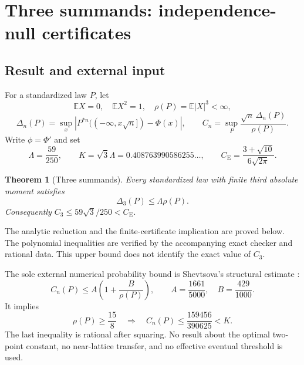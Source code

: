 \documentclass[11pt,a4paper]{article}
\numberwithin{equation}{section}
\newtheorem{theorem}{Theorem}[section]
\theoremstyle{definition}
\theoremstyle{remark}
\newcommand{\E}{\mathbb E}
\newcommand{\CE}{C_{\mathrm E}}
\newcommand{\Lam}{\frac{59}{250}}
\newcommand{\rhoMax}{\frac{15}{8}}
\begin{document}
\section{Three summands: independence-null certificates}\label{n3:section}
\subsection{Result and external input}
For a standardized law $P$, let
\[
 \E X=0,\quad \E X^2=1,\quad \rho(P)=\E|X|^3<\infty,
\]
\[
 \Delta_n(P)=\sup_x\left|P^{*n}(( -\infty,x\sqrt n])-\Phi(x)\right|,
 \qquad C_n=\sup_P\frac{\sqrt n\,\Delta_n(P)}{\rho(P)}.
\]
Write $\phi=\Phi'$ and set
\[
 \Lambda=\Lam,\qquad K=\sqrt3\Lambda
 =0.408763990586255\ldots,
 \qquad \CE=\frac{3+\sqrt{10}}{6\sqrt{2\pi}}.
\]
\begin{theorem}[Three summands]\label{n3:thm:main}
Every standardized law with finite third absolute moment satisfies
\[
 \boxed{\Delta_3(P)\le\Lambda\rho(P).}
\]
Consequently $C_3\le59\sqrt3/250<\CE$.
\end{theorem}
The analytic reduction and the finite-certificate implication are proved
below. The polynomial inequalities are verified by the accompanying exact
checker and rational data. This upper bound does not identify the exact value of $C_3$.

The sole external numerical probability bound is Shevtsova's structural
estimate \cite{Shevtsova2013}:
\begin{equation}\label{n3:eq:struct}
 C_n(P)\le A\left(1+\frac B{\rho(P)}\right),
 \qquad A=\frac{1661}{5000},\quad B=\frac{429}{1000}.
\end{equation}
It implies
\begin{equation}\label{n3:eq:large}
 \rho(P)\ge\rhoMax\quad\Longrightarrow\quad
 C_n(P)\le\frac{159456}{390625}<K.
\end{equation}
The last inequality is rational after squaring. No result about the optimal
two-point constant, no near-lattice transfer, and no effective eventual
threshold is used.
\end{document}
